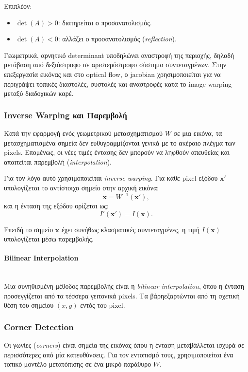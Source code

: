 \documentclass[12pt]{article}
\begin{document}
Επιπλέον:
\begin{itemize}
    \item \(\det(A) > 0\): διατηρείται ο προσανατολισμός.
    \item \(\det(A) < 0\): αλλάζει ο προσανατολισμός (\textit{reflection}).
\end{itemize}

Γεωμετρικά, αρνητικό determinant υποδηλώνει αναστροφή της περιοχής, δηλαδή μετάβαση από δεξιόστροφο σε αριστερόστροφο σύστημα συντεταγμένων.
Στην επεξεργασία εικόνας και στο optical flow, ο jacobian χρησιμοποιείται για να περιγράψει τοπικές διαστολές, συστολές και αναστροφές 
κατά το image warping μεταξύ διαδοχικών καρέ.


\subsubsection{Inverse Warping και Παρεμβολή}
Κατά την εφαρμογή ενός γεωμετρικού μετασχηματισμού \(W\) σε μια εικόνα, τα μετασχηματισμένα σημεία δεν ευθυγραμμίζονται γενικά με το ακέραιο πλέγμα των pixels. Επομένως, οι νέες τιμές έντασης δεν μπορούν να ληφθούν απευθείας και απαιτείται παρεμβολή (\textit{interpolation}).

Για τον λόγο αυτό χρησιμοποιείται \textit{inverse warping}. Για κάθε pixel εξόδου \(\mathbf{x}'\) υπολογίζεται το αντίστοιχο σημείο στην αρχική εικόνα:
\[
\mathbf{x} = W^{-1}(\mathbf{x}'),
\]
και η ένταση της εξόδου ορίζεται ως:
\[
I'(\mathbf{x}') = I(\mathbf{x}).
\]

Επειδή το σημείο \(\mathbf{x}\) έχει συνήθως κλασματικές συντεταγμένες, η τιμή \(I(\mathbf{x})\) υπολογίζεται μέσω παρεμβολής.

\paragraph{Bilinear Interpolation}
\mbox{}\\
Μια συνηθισμένη μέθοδος παρεμβολής είναι η \textit{bilinear interpolation}, όπου η ένταση προσεγγίζεται από τα τέσσερα γειτονικά pixels.
Τα βάρηεξαρτώνται από τη σχετική θέση του σημείου \((x,y)\) εντός του pixel.


\subsubsection{Corner Detection}
Οι γωνίες (\textit{corners}) είναι σημεία της εικόνας όπου η ένταση μεταβάλλεται ισχυρά σε περισσότερες από μία κατευθύνσεις. Για τον εντοπισμό τους, 
χρησιμοποιείται ένα τοπικό μοντέλο μετατόπισης σε ένα μικρό παράθυρο \(W\).
\end{document}
